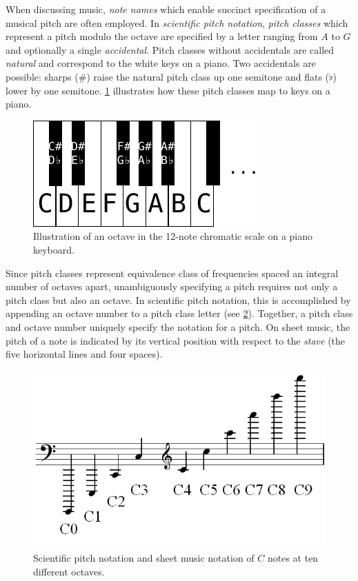 When discussing music, \emph{note names} which enable succinct specification of
a musical pitch are often employed. In \emph{scientific pitch notation},
\emph{pitch classes} which represent a pitch modulo the octave are specified by
a letter ranging from $A$ to $G$ and optionally a single \emph{accidental}. Pitch
classes without accidentals are called \emph{natural} and correspond to the white
keys on a piano. Two accidentals are possible: sharps ($\#$) raise the natural
pitch class up one semitone and flats ($\flat$) lower by one semitone.
\cref{fig:piano-keys} illustrates how these pitch classes map to keys on a
piano.

\begin{figure}[htpb]
    \centering
    \includegraphics[width=0.6\linewidth]{piano-keys.pdf}
    \caption{Illustration of an octave in the 12-note chromatic scale on a piano keyboard.}
    \label{fig:piano-keys}
\end{figure}

Since pitch classes represent equivalence class of frequencies spaced an
integral number of octaves apart, unambiguously specifying a pitch requires not
only a pitch class but also an octave. In scientific pitch notation, this is
accomplished by appending an octave number to a pitch class letter (see
\cref{fig:pitch-class}). Together, a pitch class and octave number uniquely
specify the notation for a pitch. On sheet music, the pitch of a note is
indicated by its vertical position with respect to the \emph{stave} (the five
horizontal lines and four spaces).

\begin{figure}[htpb]
    \centering
    \includegraphics[width=0.6\linewidth]{Pitch_notation.png}
    \caption{Scientific pitch notation and sheet music notation of $C$ notes at ten different octaves.}
    \label{fig:pitch-class}
\end{figure}

